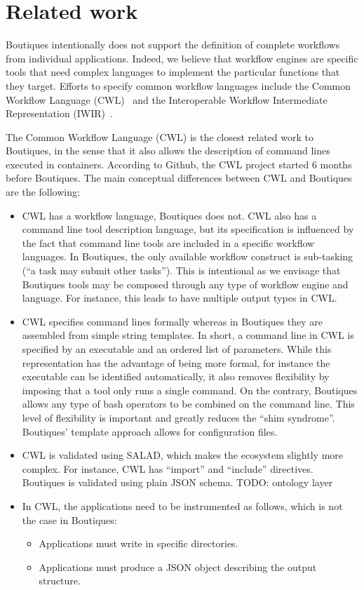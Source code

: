 \documentclass{article}
\newcommand{\todo}[2]{\color{red}TODO: #1\color{black}}
\begin{document}
\section{Related work}

Boutiques intentionally does not support the definition of complete
workflows from individual applications. Indeed, we believe that
workflow engines are specific tools that need complex languages to
implement the particular functions that they target. Efforts to
specify common workflow languages include the Common Workflow Language
(CWL)~\cite{cwl} and the Interoperable Workflow Intermediate
Representation (IWIR)~\cite{plankensteiner2011iwir}.


The Common Workflow Language (CWL) is the closest related work to
Boutiques, in the sense that it also allows the description of command
lines executed in containers. According to Github, the CWL project
started 6 months before Boutiques. The main conceptual differences
between CWL and Boutiques are the following:
\begin{itemize}
\item CWL has a workflow language, Boutiques does not. CWL also has a
  command line tool description language, but its specification is
  influenced by the fact that command line tools are included in a
  specific workflow languages. In Boutiques, the only available
  workflow construct is sub-tasking (``a task may submit other
  tasks''). This is intentional as we envisage that Boutiques tools
  may be composed through any type of workflow engine and language. For instance, this leads to have multiple output types in CWL.
\item CWL specifies command lines formally whereas in Boutiques they
  are assembled from simple string templates. In short, a command line
  in CWL is specified by an executable and an ordered list of
  parameters. While this representation has the advantage of being
  more formal, for instance the executable can be identified
  automatically, it also removes flexibility by imposing that a tool
  only runs a single command. On the contrary, Boutiques allows any
  type of bash operators to be combined on the command line. This
  level of flexibility is important and greatly reduces the ``shim
  syndrome''. Boutiques' template approach allows for configuration files. 
\item CWL is validated using SALAD, which makes the ecosystem slightly
  more complex. For instance, CWL has ``import'' and ``include''
  directives. Boutiques is validated using plain JSON schema. \todo{ontology layer}.
\item In CWL, the applications need to be instrumented as follows, which is not the case in Boutiques:
\begin{itemize}
\item Applications must write in specific directories.
\item Applications must produce a JSON object describing the output structure.
\end{itemize}
\end{itemize}
\end{document}

